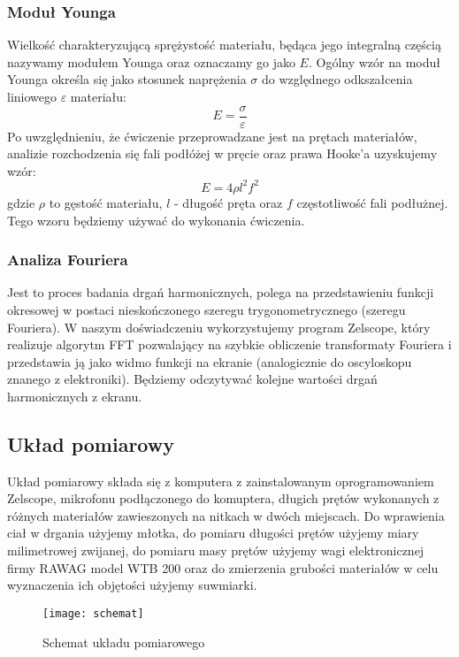 \documentclass[a4paper,12pts]{article}
\begin{document}
	\subsubsection{Moduł Younga}
	Wielkość charakteryzującą sprężystość materiału, będąca jego integralną częścią nazywamy modułem Younga oraz oznaczamy go jako $E$. Ogólny wzór na moduł Younga określa się jako stosunek naprężenia $\sigma$ do względnego odkszałcenia liniowego $\varepsilon$ materiału:
	\begin{equation}
		E = \frac{\sigma}{\varepsilon}
	\end{equation}
	Po uwzględnieniu, że ćwiczenie przeprowadzane jest na prętach materiałów, analizie rozchodzenia się fali podłóżej w pręcie oraz prawa Hooke'a uzyskujemy wzór:
	\begin{equation}
		E = 4 \rho l^2 f^2
	\end{equation}
	gdzie $\rho$ to gęstość materiału, $l$ - długość pręta oraz $f$ częstotliwość fali podłużnej. Tego wzoru będziemy używać do wykonania ćwiczenia.
	
	
	\subsubsection{Analiza Fouriera}
	Jest to proces badania drgań harmonicznych, polega na przedstawieniu funkcji okresowej w postaci nieskończonego szeregu trygonometrycznego (szeregu Fouriera). W naszym doświadczeniu wykorzystujemy program Zelscope, który realizuje algorytm FFT pozwalający na szybkie obliczenie transformaty Fouriera i przedstawia ją jako widmo funkcji na ekranie (analogicznie do oscyloskopu znanego z elektroniki). Będziemy odczytywać kolejne wartości drgań harmonicznych z ekranu.
	
	\subsection{Układ pomiarowy}
	Układ pomiarowy składa się z komputera z zainstalowanym oprogramowaniem Zelscope, mikrofonu podłączonego do komuptera, długich prętów wykonanych z różnych materiałów zawieszonych na nitkach w dwóch miejscach. Do wprawienia ciał w drgania użyjemy młotka, do pomiaru długości prętów użyjemy miary milimetrowej zwijanej, do pomiaru masy prętów użyjemy wagi elektronicznej firmy RAWAG model WTB 200 oraz do zmierzenia grubości materiałów w celu wyznaczenia ich objętości użyjemy suwmiarki.
	
	\begin{figure}[!h]
		\centering
		\texttt{[image: schemat]}
		\caption{Schemat układu pomiarowego}
		\label{schematUkladu}
	\end{figure}
	
\end{document}
